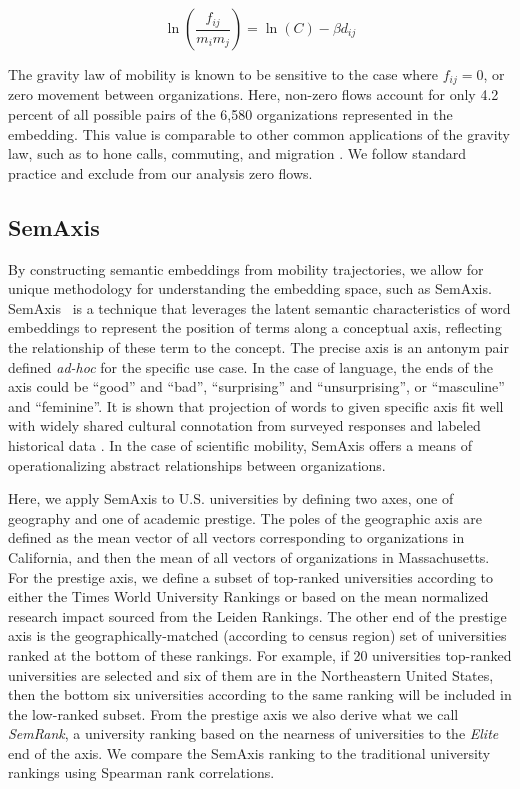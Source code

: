 \documentclass[12pt]{article} %
\begin{document}
\begin{equation}
	\label{eq:linear_flux_emb}
	\ln(\frac{f_{ij}}{m_im_j}) = \ln(C) - \beta d_{ij}
\end{equation}

The gravity law of mobility is known to be sensitive to the case where $f_{ij} = 0$, or zero movement between organizations. 
Here, non-zero flows account for only 4.2 percent of all possible pairs of  the 6,580 organizations represented in the embedding.
This value is comparable to other common applications of the gravity law, such as to hone calls, commuting, and migration \autocite{simini2012universal}.
We follow standard practice and exclude from our analysis zero flows. 


%
%
\subsection*{SemAxis}
By constructing semantic embeddings from mobility trajectories, we allow for unique methodology for understanding the embedding space, such as SemAxis.
SemAxis~\autocite{an2018semaxis} is a technique that leverages the latent semantic characteristics of word embeddings to represent the position of terms along a conceptual axis, reflecting the relationship of these term to the concept. 
The precise axis is an antonym pair defined \textit{ad-hoc} for the specific use case.
In the case of language, the ends of the axis could be ``good'' and ``bad'', ``surprising'' and ``unsurprising'', or ``masculine'' and ``feminine''. It is shown that projection of words to given specific axis fit well with widely shared cultural connotation from surveyed
responses and labeled historical data \autocite{kozlowski2018geometry}.
In the case of scientific mobility, SemAxis offers a means of operationalizing abstract relationships between organizations.

Here, we apply SemAxis to U.S. universities by defining two axes, one of geography and one of academic prestige. 
The poles of the geographic axis are defined as the mean vector of all vectors corresponding to organizations in California, and then the mean of all vectors of organizations in Massachusetts. 
For the prestige axis, we define a subset of top-ranked universities according to either the Times World University Rankings or based on the mean normalized research impact sourced from the Leiden Rankings. 
The other end of the prestige axis is the geographically-matched (according to census region) set of universities ranked at the bottom of these rankings.
For example, if 20 universities top-ranked universities are selected and six of them are in the Northeastern United States, then the bottom six universities according to the same ranking will be included in the low-ranked subset. 
From the prestige axis we also derive what we call \textit{SemRank}, a university ranking based on the nearness of universities to the \textit{Elite} end of the axis. 
We compare the SemAxis ranking to the traditional university rankings using Spearman rank correlations. 
\end{document}
